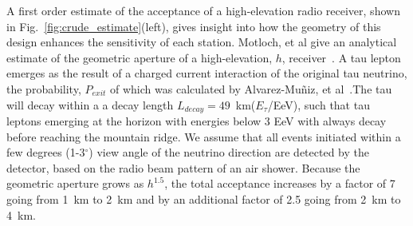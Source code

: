 \documentclass[12pt]{article}
\begin{document}
A first order estimate of the acceptance of a high-elevation radio receiver, shown in Fig.~\ref{fig:crude_estimate}(left), gives insight into how the geometry of this design enhances the sensitivity of each station. Motloch, et al give an analytical estimate of the geometric aperture of a high-elevation, $h$, receiver~\cite{Motloch2014}. 
A tau lepton emerges as the result of a charged current interaction of the original tau neutrino, the probability, $P_{exit}$ of which was calculated by  Alvarez-Mu\~niz, et al~\cite{Alvarez-Muniz2018}.The tau will decay within a a decay length $L_{decay} = 49$~km($E_{\tau}$/EeV), such that tau leptons emerging at the horizon with energies below 3 EeV with always decay before reaching the mountain ridge. We assume that all events initiated within a few degrees (1-3$^{\circ}$) view angle of the neutrino direction are detected by the detector, based on the radio beam pattern of an air shower. Because the geometric aperture grows as $h^{1.5}$, the total acceptance increases by a factor of 7 going from 1~km to 2~km and by an additional factor of 2.5 going from 2~km to 4~km. 

\end{document}
